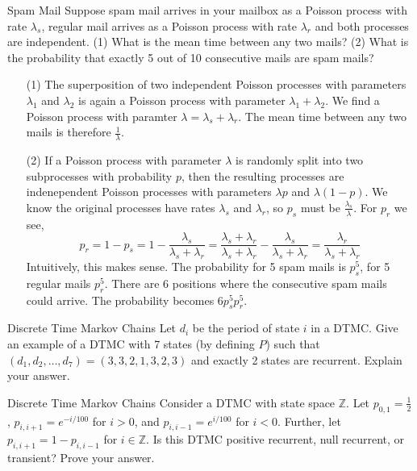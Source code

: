 \begin{problem}{Spam Mail}
 Suppose spam mail arrives in your mailbox as a Poisson process with rate $\lambda_s$, regular mail arrives as a Poisson process with rate $\lambda_r$ and both processes are independent. (1) What is the mean time between any two mails? (2) What is the probability that exactly 5 out of 10 consecutive mails are spam mails?
 \end{problem}

 \begin{solution}
   \begin{itemize}
    \item[(1)] The superposition of two independent Poisson processes with parameters $\lambda_1$ and $\lambda_2$ is again a Poisson process with parameter $\lambda_1 + \lambda_2$. We find a Poisson process with paramter $\lambda = \lambda_s + \lambda_r$. The mean time between any two mails is therefore $\frac{1}{\lambda}$.
    \item[(2)] If a Poisson process with parameter $\lambda$ is randomly split into two subprocesses with probability $p$, then the resulting processes are indenependent Poisson processes with parameters $\lambda p$ and $\lambda(1-p)$. We know the original processes have rates $\lambda_s$ and $\lambda_r$, so $p_s$ must be $\frac{\lambda_s}{\lambda}$. For $p_r$ we see,
      \[
        p_r = 1 - p_s = 1 - \frac{\lambda_s}{\lambda_s +  \lambda_r} = \frac{\lambda_s + \lambda_r}{\lambda_s +  \lambda_r} - \frac{\lambda_s}{\lambda_s +  \lambda_r} = \frac{\lambda_r}{\lambda_s + \lambda_r}
      \]
       Intuitively, this makes sense. The probability for 5 spam mails is $p_s^5$, for 5 regular mails $p_r^5$. There are 6 positions where the consecutive spam mails could arrive. The probability becomes $6p_s^5p_r^5$.
   \end{itemize}
 \end{solution}

\begin{problem}{Discrete Time Markov Chains}
Let \( d_i \) be the period of state \( i \) in a DTMC. Give an example of a DTMC with 7 states (by defining \( P \)) such that \( (d_1, d_2, \dots, d_7) = (3, 3, 2, 1, 3, 2, 3) \) and exactly 2 states are recurrent. Explain your answer.
\end{problem}

\begin{problem}{Discrete Time Markov Chains}
Consider a DTMC with state space \( \mathbb{Z} \). Let \( p_{0,1} = \frac{1}{2} \), \( p_{i,i+1} = e^{-i/100} \) for \( i > 0 \), and \( p_{i,i-1} = e^{i/100} \) for \( i < 0 \). Further, let \( p_{i,i+1} = 1 - p_{i,i-1} \) for \( i \in \mathbb{Z} \). Is this DTMC positive recurrent, null recurrent, or transient? Prove your answer.
\end{problem}

